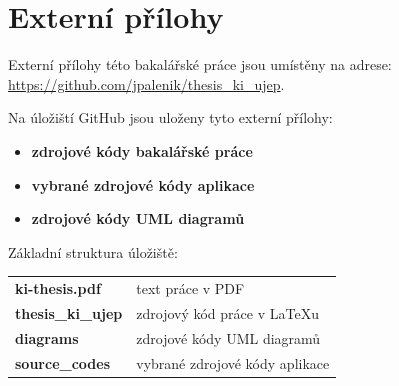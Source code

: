 \documentclass[male,czech,{is_bc}]{kitheses}
\begin{document}
\sloppy
\listoffigures %

\sloppy
\printbibliography[title=Seznam použitých zdrojů]

\appendix

\chapter{Externí přílohy\label{sec:ep}}

Externí přílohy této bakalářské práce jsou umístěny na adrese:\\ \url{https://github.com/jpalenik/thesis_ki_ujep}.

Na úložiští GitHub jsou uloženy tyto externí přílohy:

\begin{itemize}
\item \textbf{zdrojové kódy bakalářské práce}
\item \textbf{vybrané zdrojové kódy aplikace}
\item \textbf{zdrojové kódy UML diagramů}
\end{itemize}

Základní struktura úložiště:

\begin{table}[h]
\begin{tabular}{ll}
\textbf{ki-thesis.pdf} & text práce v PDF \\
\textbf{thesis\_ki\_ujep} & zdrojový kód práce v \LaTeX{}u \\
\textbf{diagrams} & zdrojové kódy UML diagramů \\
\textbf{source\_codes} & vybrané zdrojové kódy aplikace \\
\end{tabular}
\end{table}
\end{document}
